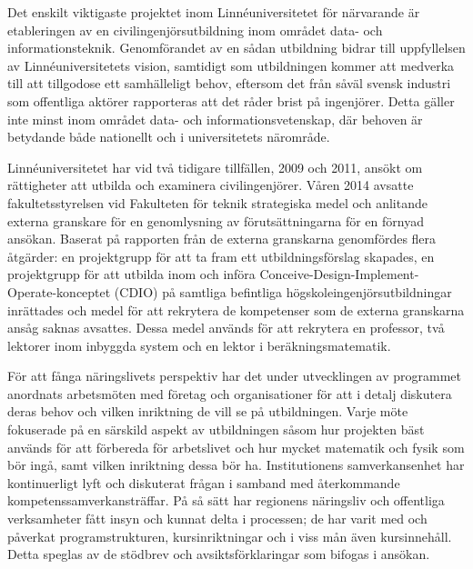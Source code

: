 Det enskilt viktigaste projektet inom Linnéuniversitetet för närvarande är etableringen av en civilingenjörsutbildning inom området data- och informationsteknik. Genomförandet av en sådan utbildning bidrar till uppfyllelsen av Linnéuniversitetets vision, samtidigt som utbildningen kommer att medverka till att tillgodose ett samhälleligt behov, eftersom det från såväl svensk industri som offentliga aktörer rapporteras att det råder brist på ingenjörer. Detta gäller inte minst inom området data- och informationsvetenskap, där behoven är betydande både nationellt och i universitetets närområde.

Linnéuniversitetet har vid två tidigare tillfällen, 2009 och 2011, ansökt om rättigheter att utbilda och examinera civilingenjörer. Våren 2014 avsatte fakultetsstyrelsen vid Fakulteten för teknik strategiska medel och anlitande externa granskare för en genomlysning av förutsättningarna för en förnyad ansökan. Baserat på rapporten från de externa granskarna genomfördes flera åtgärder: en projektgrupp för att ta fram ett utbildningsförslag skapades, en projektgrupp för att utbilda inom och införa Conceive-Design-Implement-Operate-konceptet (CDIO) på samtliga befintliga högskoleingenjörsutbildningar inrättades och medel för att rekrytera de kompetenser som de externa granskarna ansåg saknas avsattes. Dessa medel används för att rekrytera en professor, två lektorer inom inbyggda system och en lektor i beräkningsmatematik.

För att fånga näringslivets perspektiv har det under utvecklingen av programmet anordnats arbetsmöten med företag och organisationer för att i detalj diskutera deras behov och vilken inriktning de vill se på utbildningen. Varje möte fokuserade på en särskild aspekt av utbildningen såsom hur projekten bäst används för att förbereda för arbetslivet och hur mycket matematik och fysik som bör ingå, samt vilken inriktning dessa bör ha. Institutionens samverkansenhet har kontinuerligt lyft och diskuterat frågan i samband med återkommande kompetenssamverkansträffar. På så sätt har regionens näringsliv och offentliga verksamheter fått insyn och kunnat delta i processen; de har varit med och påverkat programstrukturen, kursinriktningar och i viss mån även kursinnehåll. Detta speglas av de stödbrev och avsiktsförklaringar som bifogas i ansökan.